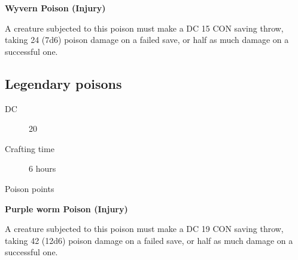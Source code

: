 \textbf{Wyvern Poison (Injury)}

A creature subjected to this poison must make a DC 15 CON saving throw, taking 24 (7d6) poison damage on a failed save, or half as much damage on a successful one.

\subsection{Legendary poisons}

\begin{description}
\item [DC] 20
\item [Crafting time] 6 hours
\item [Poison points] \poison\poison\poison\poison\poison\poison
\end{description}

\textbf{Purple worm Poison (Injury)}

A creature subjected to this poison must make a DC 19 CON saving throw, taking 42 (12d6) poison damage on a failed save, or half as much damage on a successful one.
